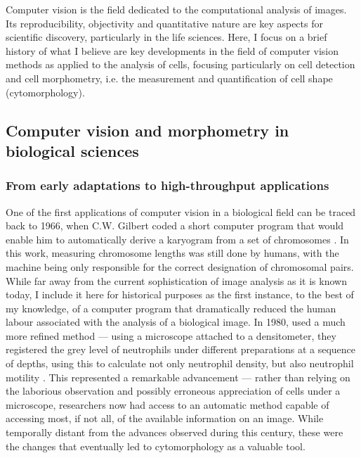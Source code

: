 Computer vision is the field dedicated to the computational analysis of images. Its reproducibility, objectivity and quantitative nature are key aspects for scientific discovery, particularly in the life sciences. Here, I focus on a brief history of what I believe are key developments in the field of computer vision methods as applied to the analysis of cells, focusing particularly on cell detection and cell morphometry, i.e. the measurement and quantification of cell shape (cytomorphology).

\subsection{Computer vision and morphometry in biological sciences}

\subsubsection{From early adaptations to high-throughput applications}

One of the first applications of computer vision in a biological field can be traced back to 1966, when C.W. Gilbert coded a short computer program that would enable him to automatically derive a karyogram from a set of chromosomes \cite{Gilbert1966-km}. In this work, measuring chromosome lengths was still done by humans, with the machine being only responsible for the correct designation of chromosomal pairs. While far away from the current sophistication of image analysis as it is known today, I include it here for historical purposes as the first instance, to the best of my knowledge, of a computer program that dramatically reduced the human labour associated with the analysis of a biological image. In 1980,  used a much more refined method --- using a microscope attached to a densitometer, they registered the grey level of neutrophils under different preparations at a sequence of depths, using this to calculate not only neutrophil density, but also neutrophil motility \cite{Howe1980-ua}. This represented a remarkable advancement --- rather than relying on the laborious observation and possibly erroneous appreciation of cells under a microscope, researchers now had access to an automatic method capable of accessing most, if not all, of the available information on an image. While temporally distant from the advances observed during this century, these were the changes that eventually led to cytomorphology as a valuable tool. 

